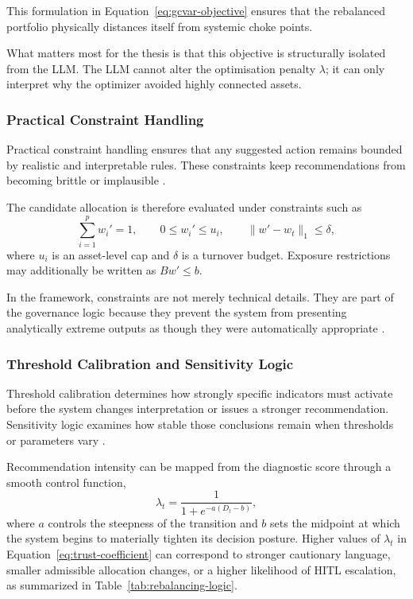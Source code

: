 \documentclass[11pt]{article}
\begin{document}
This formulation in Equation~\eqref{eq:gcvar-objective} ensures that the rebalanced portfolio physically distances itself from systemic choke points.

What matters most for the thesis is that this objective is structurally isolated from the LLM. The LLM cannot alter the optimisation penalty $\lambda$; it can only interpret why the optimizer avoided highly connected assets.
\fi

\subsubsection{Practical Constraint Handling}
Practical constraint handling ensures that any suggested action remains bounded by realistic and interpretable rules. These constraints keep recommendations from becoming brittle or implausible \cite{jagannathan2003,kolm2014,krokhmal2002}.

The candidate allocation is therefore evaluated under constraints such as
\begin{equation}
\label{eq:rebalancing-constraints}
\sum_{i=1}^{p} w_i' = 1,
\qquad
0 \le w_i' \le u_i,
\qquad
\lVert w' - w_t \rVert_1 \le \delta,
\end{equation}
where $u_i$ is an asset-level cap and $\delta$ is a turnover budget. Exposure restrictions may additionally be written as $B w' \le b$.

In the framework, constraints are not merely technical details. They are part of the governance logic because they prevent the system from presenting analytically extreme outputs as though they were automatically appropriate \cite{mifid2014,gdpr2016}.

\subsubsection{Threshold Calibration and Sensitivity Logic}
Threshold calibration determines how strongly specific indicators must activate before the system changes interpretation or issues a stronger recommendation. Sensitivity logic examines how stable those conclusions remain when thresholds or parameters vary \cite{white2000,lo2002}.

Recommendation intensity can be mapped from the diagnostic score through a smooth control function,
\begin{equation}
\label{eq:trust-coefficient}
\lambda_t = \frac{1}{1 + e^{-a(D_t - b)}},
\end{equation}
where $a$ controls the steepness of the transition and $b$ sets the midpoint at which the system begins to materially tighten its decision posture. Higher values of $\lambda_t$ in Equation~\eqref{eq:trust-coefficient} can correspond to stronger cautionary language, smaller admissible allocation changes, or a higher likelihood of HITL escalation, as summarized in Table~\ref{tab:rebalancing-logic}.
\end{document}
